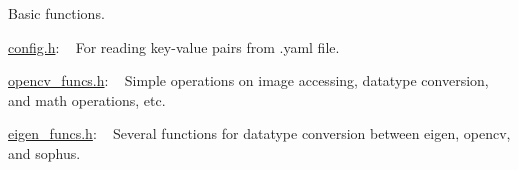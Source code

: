 Basic functions.

\mbox{\hyperlink{config_8h_source}{config.\+h}}\+: ~\newline
 For reading key-\/value pairs from .yaml file.

\mbox{\hyperlink{opencv__funcs_8h_source}{opencv\+\_\+funcs.\+h}}\+: ~\newline
 Simple operations on image accessing, datatype conversion, and math operations, etc.

\mbox{\hyperlink{eigen__funcs_8h_source}{eigen\+\_\+funcs.\+h}}\+: ~\newline
 Several functions for datatype conversion between eigen, opencv, and sophus. 